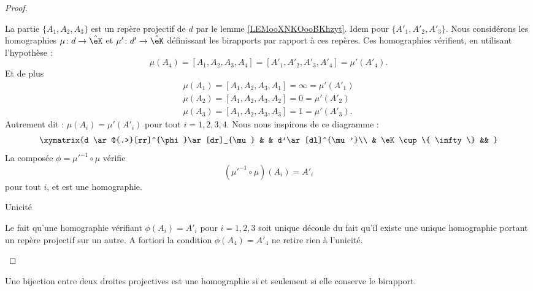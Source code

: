 \begin{proof}
\begin{subproof}
            La partie \( \{ A_1,A_2,A_3 \}\) est un repère projectif de \( d\) par le lemme \ref{LEMooXNKOooBKhzyt}. Idem pour \( \{ A'_1,A'_2,A'_3 \}\). Nous considérons les homographies \( \mu\colon d\to  \hat \eK\) et \( \mu'\colon d'\to \hat\eK\) définissant les birapports par rapport à ces repères. Ces homographies vérifient, en utilisant l'hypothèse :
            \begin{equation}
                \mu(A_4)=[A_1,A_2,A_3,A_4]=[A'_1,A'_2,A'_3,A'_4]=\mu'(A'_4).
            \end{equation}
            Et de plus
            \begin{subequations}
                \begin{align}
                    \mu(A_1)=[A_1,A_2,A_3,A_1]=\infty=\mu'(A'_1)\\
                    \mu(A_2)=[A_1,A_2,A_3,A_2]=0=\mu'(A'_2)\\
                    \mu(A_3)=[A_1,A_2,A_3,A_3]=1=\mu'(A'_3).
                \end{align}
            \end{subequations}
            Autrement dit : \( \mu(A_i)=\mu'(A'_i)\) pour tout \( i=1,2,3,4\). Nous nous inspirons de ce diagramme :
            \begin{equation}
            \xymatrix{%
                d \ar@{.>}[rr]^{\phi}\ar[dr]_{\mu}  &    &   d'\ar[dl]^{\mu'}\\
                &  \eK\cup\{ \infty \} &&
               }
            \end{equation}
            La composée \( \phi=\mu'^{-1}\circ\mu\) vérifie
            \begin{equation}
                (\mu'^{-1}\circ\mu)(A_i)=A'_i
            \end{equation}
            pour tout \( i\), et est une homographie.

        \item[Unicité]

            Le fait qu'une homographie vérifiant \( \phi(A_i)=A'_i\) pour \( i=1,2,3\) soit unique découle du fait qu'il existe une unique homographie portant un repère projectif sur un autre. A fortiori la condition \( \phi(A_4)=A'_4\) ne retire rien à l'unicité.

    \end{subproof}
\end{proof}

\begin{theorem}
    Une bijection entre deux droites projectives est une homographie si et seulement si elle conserve le birapport.
\end{theorem}

